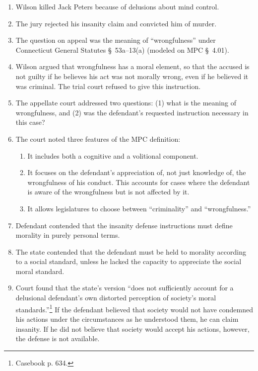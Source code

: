 \begin{enumerate}
    \item Wilson killed Jack Peters because of delusions about mind control.
    \item The jury rejected his insanity claim and convicted him of murder.  
    \item The question on appeal was the meaning of ``wrongfulness'' under 
    Connecticut General Statutes \S\ 53a--13(a) (modeled on MPC \S\ 4.01).
    \item Wilson argued that wrongfulness has a moral element, so that the 
    accused is not guilty if he believes his act was not morally wrong, even 
    if he believed it was criminal. The trial court refused to give this 
    instruction.
    \item The appellate court addressed two questions: (1) what is the meaning 
    of wrongfulness, and (2) was the defendant's requested instruction 
    necessary in this case?
    \item The court noted three features of the MPC definition:
    \begin{enumerate}
        \item It includes both a cognitive and a volitional component.
        \item It focuses on the defendant's appreciation of, not just 
        knowledge of, the wrongfulness of his conduct. This accounts for cases 
        where the defendant is aware of the wrongfulness but is not affected 
        by it.
        \item It allows legislatures to choose between ``criminality'' and 
        ``wrongfulness.''
    \end{enumerate}
    \item Defendant contended that the insanity defense instructions must 
    define morality in purely personal terms.
    \item The state contended that the defendant must be held to morality 
    according to a social standard, unless he lacked the capacity to 
    appreciate the social moral standard.
    \item Court found that the state's version ``does not sufficiently account 
    for a delusional defendant's own distorted perception of society's moral 
    standards.''\footnote{Casebook p. 634.} If the defendant believed that 
    society would not have condemned his actions under the circumstances as he 
    understood them, he can claim insanity. If he did not believe that society 
    would accept his actions, however, the defense is not available.

\end{enumerate}
